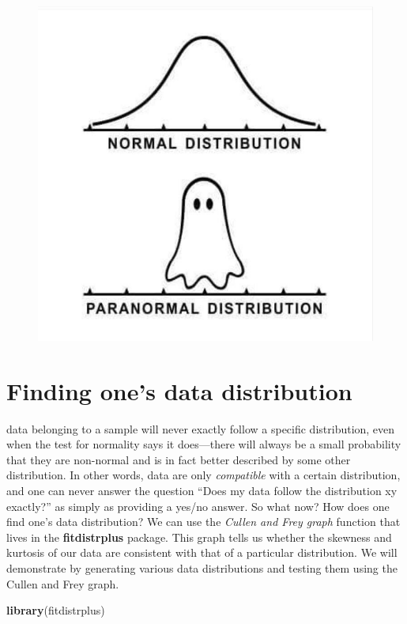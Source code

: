 \documentclass[english,10pt,a4paper,oneside]{book}
\newenvironment{Shaded}{\begin{snugshade}}{\end{snugshade}}
\newcommand{\KeywordTok}[1]{\textcolor[rgb]{0.13,0.29,0.53}{\textbf{#1}}}
\newcommand{\NormalTok}[1]{#1}
\theoremstyle{definition}
\theoremstyle{definition}
\theoremstyle{definition}
\theoremstyle{remark}
\begin{document}
\begin{figure}[h!]
\begin{center}
\includegraphics[width=0.7\linewidth]{figures/paranormal_distributions.jpeg}
\end{center}
\end{figure}

\hypertarget{finding-ones-data-distribution}{%
\section{Finding one's data
distribution}\label{finding-ones-data-distribution}}

data belonging to a sample will never exactly follow a specific
distribution, even when the test for normality says it does---there will
always be a small probability that they are non-normal and is in fact
better described by some other distribution. In other words, data are
only \emph{compatible} with a certain distribution, and one can never
answer the question \enquote{Does my data follow the distribution xy
exactly?} as simply as providing a yes/no answer. So what now? How does
one find one's data distribution? We can use the \emph{Cullen and Frey
graph} function that lives in the \textbf{fitdistrplus} package. This
graph tells us whether the skewness and kurtosis of our data are
consistent with that of a particular distribution. We will demonstrate
by generating various data distributions and testing them using the
Cullen and Frey graph.

\begin{Shaded}
\begin{Highlighting}[]
\KeywordTok{library}\NormalTok{(fitdistrplus)}
\end{Highlighting}
\end{Shaded}
\end{document}
